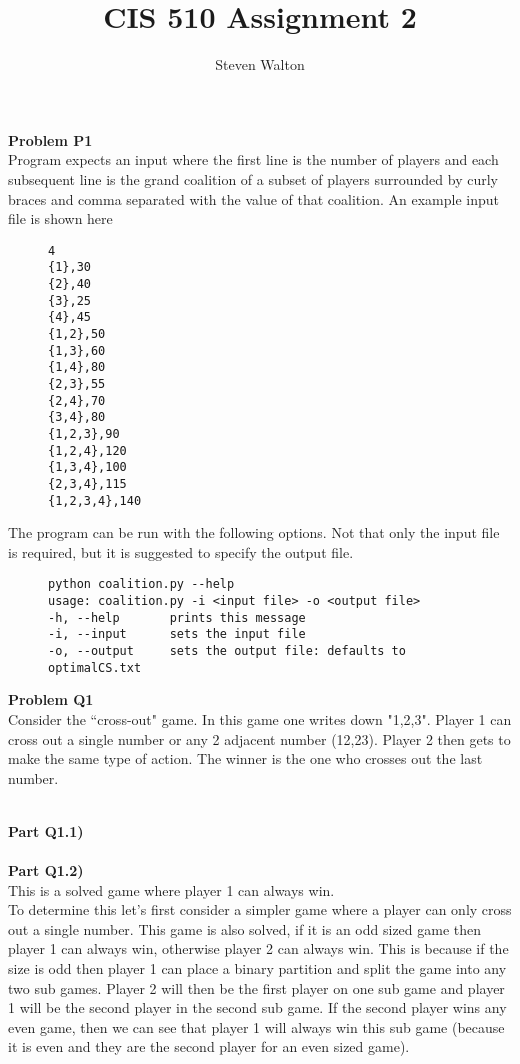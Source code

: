 \documentclass[12pt,letter]{article}
\newcommand{\problem}[1]{\vspace{3mm}\Large\textbf{{Problem {#1}\vspace{3mm}}}\normalsize\\}
\newcommand{\ppart}[1]{\vspace{2mm}\large\textbf{\\Part {#1})\vspace{2mm}}\normalsize\\}
\begin{document}
\title{CIS 510 Assignment 2}
\author{Steven Walton}
\maketitle
\problem{P1}
Program expects an input where the first line is the number of players
and each subsequent line is the grand coalition of a subset of players surrounded
by curly braces and comma separated with the value of that coalition.
An example input file is shown here
\begin{figure}[h]
    \centering
\begin{lstlisting}
4
{1},30
{2},40
{3},25
{4},45
{1,2},50
{1,3},60
{1,4},80
{2,3},55
{2,4},70
{3,4},80
{1,2,3},90
{1,2,4},120
{1,3,4},100
{2,3,4},115
{1,2,3,4},140
\end{lstlisting}
\end{figure}

The program can be run with the following options. Not that only the input file
is required, but it is suggested to specify the output file. 
\begin{figure}[h!]
    \centering
\begin{lstlisting}
python coalition.py --help
usage: coalition.py -i <input file> -o <output file>
-h, --help       prints this message
-i, --input      sets the input file
-o, --output     sets the output file: defaults to optimalCS.txt
\end{lstlisting}
\end{figure}
\FloatBarrier

\problem{Q1}
Consider the ``cross-out" game. In this game one writes down "1,2,3". Player
1 can cross out a single number or any 2 adjacent number (12,23). Player
2 then gets to make the same type of action. The winner is the one who crosses
out the last number.

\ppart{Q1.1}



\ppart{Q1.2}
This is a solved game where player 1 can always win.
\\

To determine this let's first consider a simpler game where a player can only
cross out a single number.
This game is also solved, if it is an odd sized game then player 1 can 
always win, otherwise player 2 can always win. This is because if the size 
is odd then player 1 can place a binary partition and split the game into any 
two sub games.  Player 2 will then be the first player on one sub game 
and player 1 will be the second player in the second sub game. If the second 
player wins any even game, then we can see that player 1 will always win this 
sub game (because it is even and they are the second player for an even 
sized game). 
\\
\end{document}
